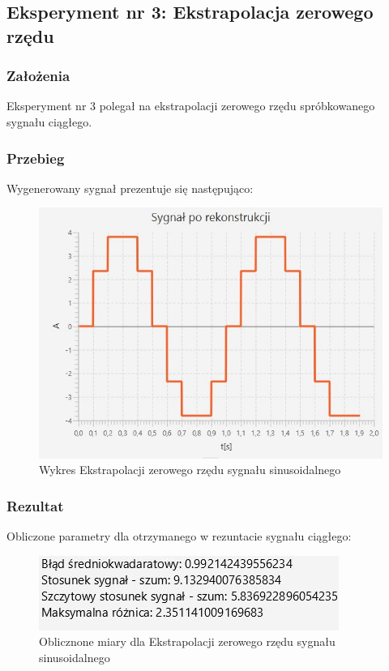\documentclass[12pt]{article}
\begin{document}
\newpage
\subsection{Eksperyment nr 3: Ekstrapolacja zerowego rzędu}


\subsubsection{Założenia}
Eksperyment nr 3 polegał na ekstrapolacji zerowego rzędu spróbkowanego sygnału ciągłego.
\subsubsection{Przebieg}
Wygenerowany sygnał prezentuje się następująco:
\begin{figure}[H]
    \centering
	\includegraphics[width=\linewidth]{sygnal_rekonstrukcja_zero.jpg}
    \caption{Wykres Ekstrapolacji zerowego rzędu sygnału sinusoidalnego}
    \label{wykres dla eksperymentu 3}
\end{figure}



\subsubsection{Rezultat}
Obliczone parametry dla otrzymanego w rezuntacie sygnału ciągłego:
\begin{figure}[H]
    \centering
	\includegraphics[width=\linewidth]{wyniki_rekonstrukcja_zero.jpg}
    \caption{Oblicznone miary dla Ekstrapolacji zerowego rzędu sygnału sinusoidalnego}
    \label{wartości dla eksperymentu 3}
\end{figure}
\end{document}
